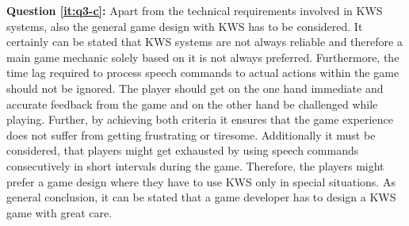 \textbf{Question \ref{it:q3-c}:}
Apart from the technical requirements involved in KWS systems, also the general game design with KWS has to be considered.
It certainly can be stated that KWS systems are not always reliable and therefore a main game mechanic solely based on it is not always preferred.
Furthermore, the time lag required to process speech commands to actual actions within the game should not be ignored.
The player should get on the one hand immediate and accurate feedback from the game and on the other hand be challenged while playing.
Further, by achieving both criteria it ensures that the game experience does not suffer from getting frustrating or tiresome.
Additionally it must be considered, that players might get exhausted by using speech commands consecutively in short intervals during the game.
Therefore, the players might prefer a game design where they have to use KWS only in special situations.
As general conclusion, it can be stated that a game developer has to design a KWS game with great care.